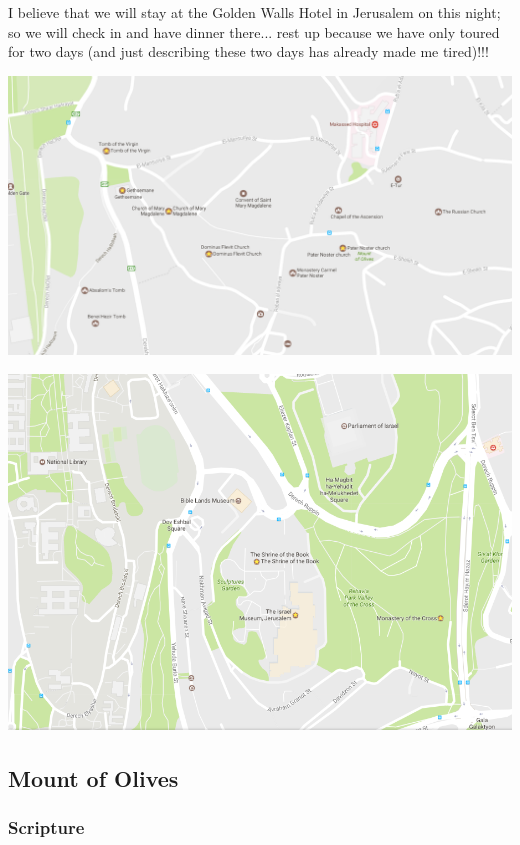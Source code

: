 \documentclass[letterpaper]{report}
\begin{document}
I believe that we will stay at the Golden Walls Hotel in Jerusalem on this
night; so we will check in and have dinner there...
rest up because we have only toured for two days
(and just describing these two days has already made me tired)!!!

\includegraphics[width=\textwidth]{MountOfOlives}

\includegraphics[width=\textwidth]{IsraelMuseum}

\clearpage
\subsection{Mount of Olives}
\begin{multicols}{2}
	\mbox{}
\end{multicols}
\subsubsection{Scripture}
\end{document}
